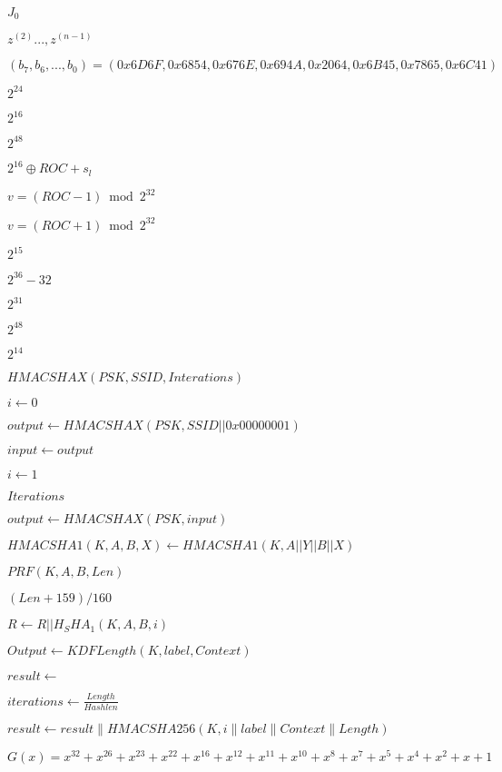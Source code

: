 \documentclass{article}
\begin{document}
$ {J}_{0} $
\pagebreak

$ {z}^{(2)}...,{z}^{(n-1)} $
\pagebreak

$ ({b}_{7},{b}_{6},...,{b}_{0}) = (0x6D6F,0x6854,0x676E,0x694A,0x2064,0x6B45,0x7865,0x6C41) $
\pagebreak

${2}^{24}$
\pagebreak

${2}^{16}$
\pagebreak

${2}^{48}$
\pagebreak

${2}^{16} \oplus ROC + s_l$
\pagebreak

$v=(ROC-1) \bmod{{2}^{32}}$
\pagebreak

$v=(ROC+1) \bmod{{2}^{32}}$
\pagebreak

${2}^{15}$
\pagebreak

${2}^{36}-32$
\pagebreak

$ {2}^{31}$
\pagebreak

$ {2}^{48}$
\pagebreak

${2}^{14}$
\pagebreak

$ HMACSHAX(PSK, SSID, Interations) $
\pagebreak

$ i \leftarrow 0 $
\pagebreak

$ output \leftarrow HMACSHAX(PSK, SSID||0x00000001) $
\pagebreak

$ input \leftarrow output $
\pagebreak

$ i \leftarrow 1 $
\pagebreak

$ Iterations $
\pagebreak

$ output \leftarrow HMACSHAX(PSK, input) $
\pagebreak

$ HMACSHA1(K, A, B, X) \leftarrow HMACSHA1(K, A || Y || B || X) $
\pagebreak

$ PRF(K, A, B, Len) $
\pagebreak

$ (Len+159)/160 $
\pagebreak

$ R \leftarrow R || H_SHA_1(K, A, B, i) $
\pagebreak

$ Output \leftarrow KDFLength (K, label, Context) $
\pagebreak

$ result \leftarrow $
\pagebreak

$ iterations \leftarrow \frac {Length}{Hashlen} $
\pagebreak

$ result \leftarrow result \parallel HMACSHA256(K, i \parallel label \parallel Context \parallel Length) $
\pagebreak

\[
 G(x) = {x}^{32} + {x}^{26} + {x}^{23} + {x}^{22} + {x}^{16} + {x}^{12} + {x}^{11} + {x}^{10} + x^8 + x^7 + x^5 + x^4 + x^2 + x + 1
\]
\pagebreak
\end{document}

